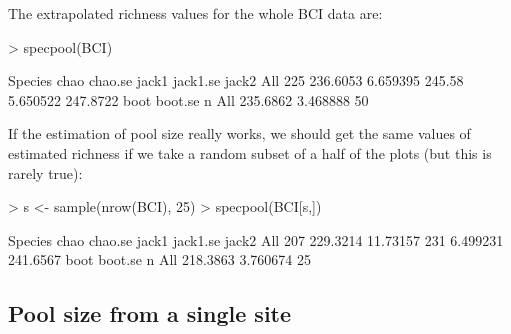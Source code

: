 \documentclass[a4paper,10pt,twocolumn]{article}
\begin{document}
The extrapolated richness values for the whole BCI data are:
\begin{Schunk}
\begin{Sinput}
> specpool(BCI)
\end{Sinput}
\begin{Soutput}
    Species     chao  chao.se  jack1 jack1.se    jack2
All     225 236.6053 6.659395 245.58 5.650522 247.8722
        boot  boot.se  n
All 235.6862 3.468888 50
\end{Soutput}
\end{Schunk}
If the estimation of pool size really works, we should get the same
values of estimated richness if we take a random subset of a half of
the plots (but this is rarely true):
\begin{Schunk}
\begin{Sinput}
> s <- sample(nrow(BCI), 25)
> specpool(BCI[s,])
\end{Sinput}
\begin{Soutput}
    Species     chao  chao.se jack1 jack1.se    jack2
All     207 229.3214 11.73157   231 6.499231 241.6567
        boot  boot.se  n
All 218.3863 3.760674 25
\end{Soutput}
\end{Schunk}

\subsection{Pool size from a single site}
\end{document}
